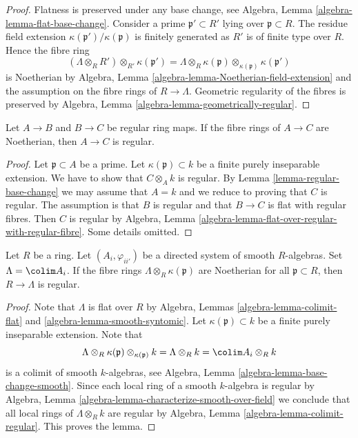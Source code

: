 \begin{proof}
Flatness is preserved under any base change, see
Algebra, Lemma \ref{algebra-lemma-flat-base-change}.
Consider a prime $\mathfrak p' \subset R'$ lying over
$\mathfrak p \subset R$. The residue field extension
$\kappa(\mathfrak p')/\kappa(\mathfrak p)$ is
finitely generated as $R'$ is of finite type over $R$.
Hence the fibre ring
$$
(\Lambda \otimes_R R') \otimes_{R'} \kappa(\mathfrak p') =
\Lambda \otimes_R \kappa(\mathfrak p) \otimes_{\kappa(\mathfrak p)} 
\kappa(\mathfrak p')
$$
is Noetherian by
Algebra, Lemma \ref{algebra-lemma-Noetherian-field-extension}
and the assumption on the fibre rings of $R \to \Lambda$.
Geometric regularity of the fibres is preserved by
Algebra, Lemma \ref{algebra-lemma-geometrically-regular}.
\end{proof}

\begin{lemma}
\label{lemma-regular-composition}
Let $A \to B$ and $B \to C$ be regular ring maps.
If the fibre rings of $A \to C$ are Noetherian, then
$A \to C$ is regular.
\end{lemma}

\begin{proof}
Let $\mathfrak p \subset A$ be a prime. Let $\kappa(\mathfrak p) \subset k$
be a finite purely inseparable extension. We have to show that
$C \otimes_A k$ is regular. By Lemma \ref{lemma-regular-base-change}
we may assume that $A = k$ and we reduce to proving that $C$ is regular.
The assumption is that $B$ is regular and that $B \to C$ is flat
with regular fibres. Then $C$ is regular by Algebra, Lemma
\ref{algebra-lemma-flat-over-regular-with-regular-fibre}.
Some details omitted.
\end{proof}

\begin{lemma}
\label{lemma-colimit-smooth-regular}
Let $R$ be a ring. Let $(A_i, \varphi_{ii'})$ be a directed system
of smooth $R$-algebras. Set $\Lambda = \colim A_i$. If the fibre
rings $\Lambda \otimes_R \kappa(\mathfrak p)$ are Noetherian for all
$\mathfrak p \subset R$, then $R \to \Lambda$ is regular.
\end{lemma}

\begin{proof}
Note that $\Lambda$ is flat over $R$ by
Algebra, Lemmas \ref{algebra-lemma-colimit-flat} and
\ref{algebra-lemma-smooth-syntomic}.
Let $\kappa(\mathfrak p) \subset k$ be a finite purely inseparable
extension. Note that
$$
\Lambda \otimes_R \kappa(\mathfrak p) \otimes_{\kappa(\mathfrak p)} k =
\Lambda \otimes_R k = \colim A_i \otimes_R k
$$
is a colimit of smooth $k$-algebras, see
Algebra, Lemma \ref{algebra-lemma-base-change-smooth}.
Since each local ring of a smooth $k$-algebra is regular by
Algebra, Lemma \ref{algebra-lemma-characterize-smooth-over-field}
we conclude that all local rings of $\Lambda \otimes_R k$ are
regular by
Algebra, Lemma \ref{algebra-lemma-colimit-regular}.
This proves the lemma.
\end{proof}

